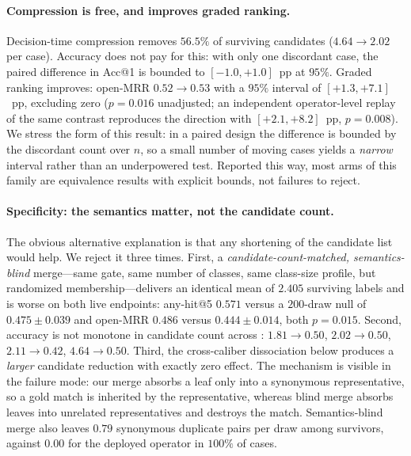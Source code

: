 \paragraph{Compression is free, and improves graded ranking.}
Decision-time compression removes $56.5\%$ of surviving candidates ($4.64 \rightarrow 2.02$ per case).
Accuracy does not pay for this: with only one discordant case, the paired difference in Acc@1 is bounded to $[-1.0, +1.0]$~pp at $95\%$.
Graded ranking improves: open-MRR $0.52 \rightarrow 0.53$ with a $95\%$ interval of $[+1.3, +7.1]$~pp, excluding zero ($p=0.016$ unadjusted; an independent operator-level replay of the same contrast reproduces the direction with $[+2.1, +8.2]$~pp, $p=0.008$).
We stress the form of this result: in a paired design the difference is bounded by the discordant count over $n$, so a small number of moving cases yields a \emph{narrow} interval rather than an underpowered test.
Reported this way, most arms of this family are equivalence results with explicit bounds, not failures to reject.

\paragraph{Specificity: the semantics matter, not the candidate count.}
The obvious alternative explanation is that any shortening of the candidate list would help.
We reject it three times.
First, a \emph{candidate-count-matched, semantics-blind} merge---same gate, same number of classes, same class-size profile, but randomized membership---delivers an identical mean of $2.405$ surviving labels and is worse on both live endpoints: any-hit@5 $0.571$ versus a $200$-draw null of $0.475 \pm 0.039$ and open-MRR $0.486$ versus $0.444 \pm 0.014$, both $p=0.015$.
Second, accuracy is not monotone in candidate count across : $1.81 \rightarrow 0.50$, $2.02 \rightarrow 0.50$, $2.11 \rightarrow 0.42$, $4.64 \rightarrow 0.50$.
Third, the cross-caliber dissociation below produces a \emph{larger} candidate reduction with exactly zero effect.
The mechanism is visible in the failure mode: our merge absorbs a leaf only into a synonymous representative, so a gold match is inherited by the representative, whereas blind merge absorbs leaves into unrelated representatives and destroys the match.
Semantics-blind merge also leaves $0.79$ synonymous duplicate pairs per draw among survivors, against $0.00$ for the deployed operator in $100\%$ of cases.

